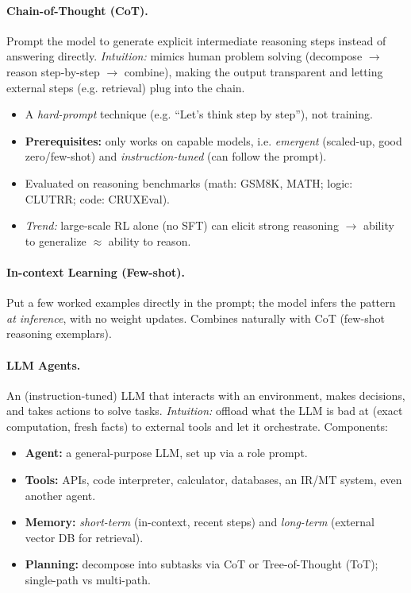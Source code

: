 \documentclass{article}
\begin{document}
\paragraph{Chain-of-Thought (CoT).} Prompt the model to generate explicit intermediate reasoning steps instead of answering directly. \textit{Intuition:} mimics human problem solving (decompose $\rightarrow$ reason step-by-step $\rightarrow$ combine), making the output transparent and letting external steps (e.g. retrieval) plug into the chain.
\begin{itemize}
    \item A \textit{hard-prompt} technique (e.g. ``Let's think step by step''), not training.
    \item \textbf{Prerequisites:} only works on capable models, i.e. \textit{emergent} (scaled-up, good zero/few-shot) and \textit{instruction-tuned} (can follow the prompt).
    \item Evaluated on reasoning benchmarks (math: GSM8K, MATH; logic: CLUTRR; code: CRUXEval).
    \item \textit{Trend:} large-scale RL alone (no SFT) can elicit strong reasoning $\rightarrow$ ability to generalize $\approx$ ability to reason.
\end{itemize}

\paragraph{In-context Learning (Few-shot).} Put a few worked examples directly in the prompt; the model infers the pattern \textit{at inference}, with no weight updates. Combines naturally with CoT (few-shot reasoning exemplars).

\paragraph{LLM Agents.} An (instruction-tuned) LLM that interacts with an environment, makes decisions, and takes actions to solve tasks. \textit{Intuition:} offload what the LLM is bad at (exact computation, fresh facts) to external tools and let it orchestrate. Components:
\begin{itemize}
    \item \textbf{Agent:} a general-purpose LLM, set up via a role prompt.
    \item \textbf{Tools:} APIs, code interpreter, calculator, databases, an IR/MT system, even another agent.
    \item \textbf{Memory:} \textit{short-term} (in-context, recent steps) and \textit{long-term} (external vector DB for retrieval).
    \item \textbf{Planning:} decompose into subtasks via CoT or Tree-of-Thought (ToT); single-path vs multi-path.
\end{itemize}
\end{document}
